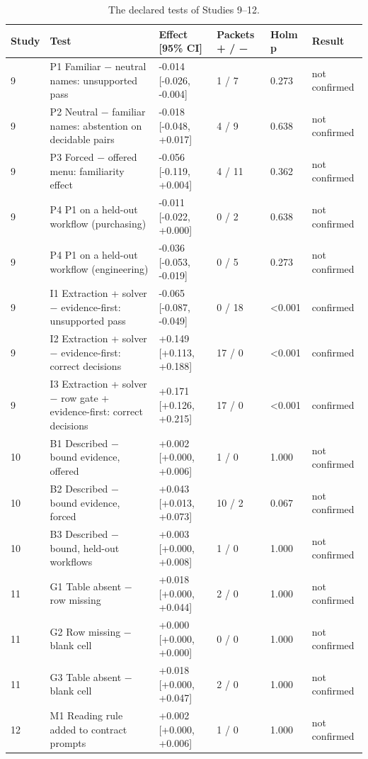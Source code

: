 \documentclass[10pt,twocolumn]{article}
\begin{document}
\begin{table}[t]
\centering\footnotesize\setlength{\tabcolsep}{4pt}
\caption{The declared tests of Studies 9–12.}
\label{tab:7}
\begin{tabularx}{\textwidth}{l>{\raggedright\arraybackslash}Xllll}
\toprule
\textbf{Study} & \textbf{Test} & \textbf{Effect [95\% CI]} & \textbf{Packets + / −} & \textbf{Holm p} & \textbf{Result} \\
\midrule
9 & P1 Familiar − neutral names: unsupported pass & -0.014 [-0.026, -0.004] & 1 / 7 & 0.273 & not confirmed \\
9 & P2 Neutral − familiar names: abstention on decidable pairs & -0.018 [-0.048, +0.017] & 4 / 9 & 0.638 & not confirmed \\
9 & P3 Forced − offered menu: familiarity effect & -0.056 [-0.119, +0.004] & 4 / 11 & 0.362 & not confirmed \\
9 & P4 P1 on a held-out workflow (purchasing) & -0.011 [-0.022, +0.000] & 0 / 2 & 0.638 & not confirmed \\
9 & P4 P1 on a held-out workflow (engineering) & -0.036 [-0.053, -0.019] & 0 / 5 & 0.273 & not confirmed \\
9 & I1 Extraction + solver − evidence-first: unsupported pass & -0.065 [-0.087, -0.049] & 0 / 18 & <0.001 & confirmed \\
9 & I2 Extraction + solver − evidence-first: correct decisions & +0.149 [+0.113, +0.188] & 17 / 0 & <0.001 & confirmed \\
9 & I3 Extraction + solver − row gate + evidence-first: correct decisions & +0.171 [+0.126, +0.215] & 17 / 0 & <0.001 & confirmed \\
10 & B1 Described − bound evidence, offered & +0.002 [+0.000, +0.006] & 1 / 0 & 1.000 & not confirmed \\
10 & B2 Described − bound evidence, forced & +0.043 [+0.013, +0.073] & 10 / 2 & 0.067 & not confirmed \\
10 & B3 Described − bound, held-out workflows & +0.003 [+0.000, +0.008] & 1 / 0 & 1.000 & not confirmed \\
11 & G1 Table absent − row missing & +0.018 [+0.000, +0.044] & 2 / 0 & 1.000 & not confirmed \\
11 & G2 Row missing − blank cell & +0.000 [+0.000, +0.000] & 0 / 0 & 1.000 & not confirmed \\
11 & G3 Table absent − blank cell & +0.018 [+0.000, +0.047] & 2 / 0 & 1.000 & not confirmed \\
12 & M1 Reading rule added to contract prompts & +0.002 [+0.000, +0.006] & 1 / 0 & 1.000 & not confirmed \\

\end{tabularx}
\end{table}
\end{document}
